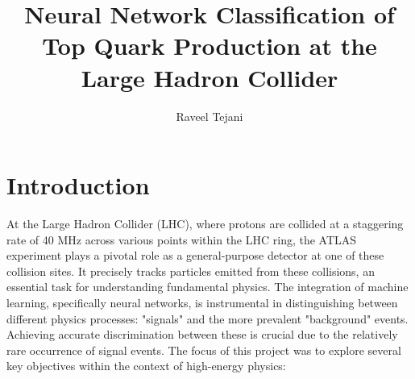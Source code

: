 \documentclass[]{article}
\title{Neural Network Classification of Top Quark Production at the Large Hadron Collider }
\author{Raveel Tejani}
\begin{document}
\maketitle
\thispagestyle{empty}
\clearpage

\tableofcontents 
\thispagestyle{empty}
\clearpage

\listoftables
\thispagestyle{empty}
\clearpage
             
\listoffigures
\thispagestyle{empty}
\clearpage     

\section{Introduction}

At the Large Hadron Collider (LHC), where protons are collided at a staggering rate of 40 MHz across various points within the LHC ring, the ATLAS experiment plays a pivotal role as a general-purpose detector at one of these collision sites. It precisely tracks particles emitted from these collisions, an essential task for understanding fundamental physics. The integration of machine learning, specifically neural networks, is instrumental in distinguishing between different physics processes: "signals" and the more prevalent "background" events. Achieving accurate discrimination between these is crucial due to the relatively rare occurrence of signal events. The focus of this project was to explore several key objectives within the context of high-energy physics:
\end{document}
